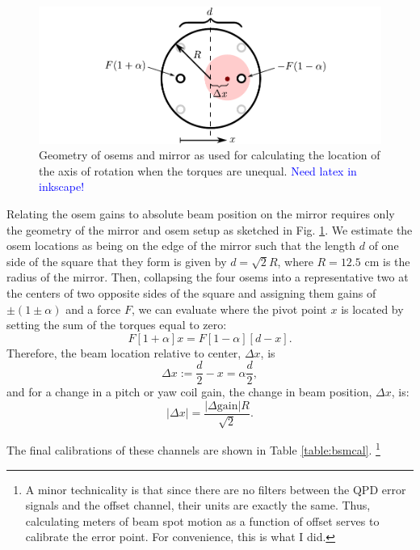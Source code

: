 \begin{figure}
\begin{centering}
\includegraphics[width=0.5\columnwidth]{figures/geometry_mirror_osems.pdf}
\caption{Geometry of osems and mirror as used for calculating the
  location of the axis of rotation when the torques are
  unequal. \textcolor{blue}{Need latex in inkscape!}}
\label{fig:mirror_osem_geometry}
\end{centering}
\end{figure}

Relating the osem gains to absolute beam position on the mirror
requires only the geometry of the mirror and osem setup as sketched in
Fig. \ref{fig:mirror_osem_geometry}. We estimate the osem locations as
being on the edge of the mirror such that the length $d$ of one side
of the square that they form is given by $d =\sqrt{2} R$, where $R =
12.5$ cm is the radius of the mirror. Then, collapsing the four osems
into a representative two at the centers of two opposite sides of the
square and assigning them gains of $\pm (1 \pm \alpha)$ and a force
$F$, we can evaluate where the pivot point $x$ is located by setting
the sum of the torques equal to zero:
\begin{equation}
F [1+\alpha] x = F [1-\alpha][d-x].
\end{equation}
Therefore, the beam location relative to center, $\Delta x$, is
\begin{equation}
\Delta x := \frac{d}{2} - x = \alpha \frac{d}{2},
\end{equation}
and for a change in a pitch or yaw coil gain, the change in beam
position, $\Delta x$, is:
\begin{equation}
|\Delta{x}| = \frac{|\Delta{\mbox{gain}}| R}{\sqrt{2}} .
\end{equation}

The final calibrations of these channels are shown in Table
\ref{table:bsmcal}. \footnote{A minor
  technicality is that since there are no filters between the QPD
  error signals and the offset channel, their units are exactly the
  same. Thus, calculating meters of beam spot motion as a function of
  offset serves to calibrate the error point. For convenience, this is
  what I did.}


